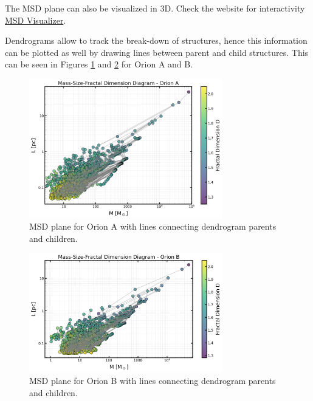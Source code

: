 The MSD plane can also be visualized in 3D. Check the website for interactivity \href{https://simonesped.github.io/MSD_Viz/}{MSD Visualizer}.

Dendrograms allow to track the break-down of structures, hence this information can be plotted as well by drawing lines between parent and child structures. 
This can be seen in Figures \ref{fig:MSD_orion_A_lines} and \ref{fig:MSD_orion_B_lines} for Orion A and B.

\begin{figure}[t]
    \centering
    \includegraphics[width=0.75\textwidth]{figures/MSD_Orion_A_with_lines.png}
    \caption{MSD plane for Orion A with lines connecting dendrogram parents and children.}
    \label{fig:MSD_orion_A_lines}
\end{figure}

\begin{figure}[t]
    \centering
    \includegraphics[width=0.75\textwidth]{figures/MSD_Orion_B_with_lines.png}
    \caption{MSD plane for Orion B with lines connecting dendrogram parents and children.}
    \label{fig:MSD_orion_B_lines}
\end{figure}

